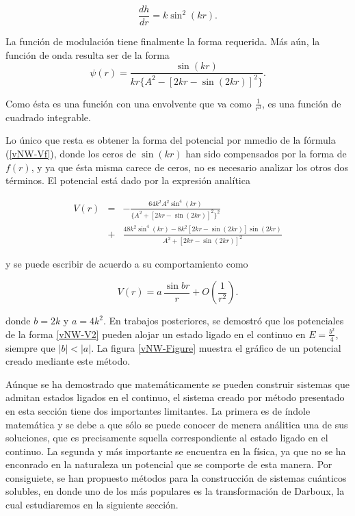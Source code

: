 \begin{equation*}
\frac{dh}{dr} =  k \sin^2(kr).
\end{equation*}

La función de modulación tiene finalmente la forma requerida. Más aún, la función de onda resulta ser de la forma 
\begin{equation*}
	\psi(r) = \frac{\sin(kr)}{k r \{A^2 - [2 k r-\sin(2kr)]^2\}}.
\end{equation*}

Como ésta es una función con una envolvente que va como $\frac{1}{r^3}$, es una función de cuadrado integrable.

Lo único que resta es obtener la forma del potencial por mmedio de la fórmula (\ref{vNW-Vf}), donde los ceros de $\sin(kr)$ han sido compensados por la forma de $f(r)$, y ya que ésta misma carece de ceros, no es necesario analizar los otros dos términos. El potencial está dado por la expresión analítica

\begin{eqnarray*}
	V(r)&=&-\frac{64 k^2 A^2 \sin^4(kr)}{\{A^2 + [2kr - \sin(2kr)]^2\}^2}
	\\
	 &+& \frac{48 k^2 \sin^4(kr) - 8 k^2[2kr - \sin(2kr)]\sin(2kr)}{A^2 + [2kr - \sin(2kr)]^2}
\end{eqnarray*}


y se puede escribir de acuerdo a su comportamiento como

\begin{equation}
	V(r) = a\,\frac{\sin{br}}{r}+ O\left(\frac{1}{r^2}\right).\label{vNW-V2}
\end{equation}

donde $b = 2 k$ y $a = 4 k^2$. En trabajos posteriores, se demostró que los potenciales de la forma \ref{vNW-V2} pueden alojar un estado ligado en el continuo en $E = \frac{b^2}{4}$, siempre que   $|b| <|a|$. La figura \ref{vNW-Figure} muestra el gráfico de un potencial creado mediante este método. 

Aúnque se ha demostrado que matemáticamente se pueden construir sistemas que admitan estados ligados en el continuo, el sistema creado por método presentado en esta sección tiene dos importantes limitantes. La primera es de índole matemática y se debe a que sólo se puede conocer de menera análitica una de sus soluciones, que es precisamente squella correspondiente al estado ligado en el continuo. La segunda y más importante se encuentra en la física, ya que no se ha enconrado en la naturaleza un potencial que se comporte de esta manera. Por consiguiete, se han propuesto métodos para la construcción de sistemas cuánticos solubles, en donde uno de los más populares es la transformación de Darboux, la cual estudiaremos en la siguiente sección.

